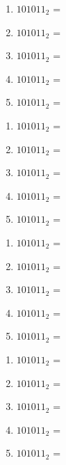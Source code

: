 \documentclass[11pt]{exam}
\begin{document}
	\creerDoc
	
	
	
	\begin{enumerate}
		\item $101011_2$ = 
		\item \( 101011_2 \) = 
		\item \( 101011_2 \) = 
		\item \( 101011_2 \) = 
		\item \( 101011_2 \) = 
	\end{enumerate}
	


	
	\begin{enumerate}
		\item \( 101011_2 \) = 
		\item \( 101011_2 \) = 
		\item \( 101011_2 \) = 
		\item \( 101011_2 \) = 
		\item \( 101011_2 \) = 
	\end{enumerate}

	
	
	
	
	\begin{enumerate}
		\item \( 101011_2 \) = 
		\item \( 101011_2 \) = 
		\item \( 101011_2 \) = 
		\item \( 101011_2 \) = 
		\item \( 101011_2 \) = 
	\end{enumerate}
	
	
	
	
	\begin{enumerate}
		\item \( 101011_2 \) = 
		\item \( 101011_2 \) = 
		\item \( 101011_2 \) = 
		\item \( 101011_2 \) = 
		\item \( 101011_2 \) = 
	\end{enumerate}
	
	
	
	
\end{document}
